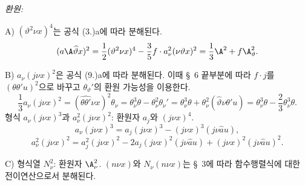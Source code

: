 
\noindent\emph{환원:}

\noindent A) $(\vartheta^2\nu x)^4$는 공식 (3.)a에 따라 분해된다.
\[
(a\A\widehat{\vartheta}x)^2=\frac12(\vartheta^2\nu x)^4-\frac35 f\cdot a_\nu^2(\nu\vartheta x)^2
=\frac13\A^2+f\A_\vartheta^2.
\]

\noindent B) $a_\nu(j\nu x)^2$은 공식 (9.)a에 따라 분해된다. 이때 \S\ 6 끝부분에 따라 $f\cdot j$를 $(\theta\theta'u)^2$으로 바꾸고 $\theta_\vartheta'$의 환원 가능성을 이용한다.
\[
\frac13a_\nu(j\nu x)^2=(\widehat{\theta\theta'}\nu x)^2\theta_\nu
=\theta_\nu^3\theta-\theta_\nu^2\theta_\nu'
=\theta_\nu^3\theta+\theta_\nu^2(\widehat{\vartheta}\nu\theta'u)
=\theta_\nu^3\theta-\frac23\theta_\nu^3\theta.
\]
형식 $a_\nu(j\nu x)^3$과 $a_\nu^2(j\nu x)^2$: 환원자 $a_j$와 $(j\nu x)^4$.
\[
a_\nu(j\nu x)^3=a_j(j\nu x)^3-(j\nu x)^3(j\nu\widehat{a}u),
\]
\[
a_\nu^2(j\nu x)^2=a_j^2(j\nu x)^2-2a_j(j\nu x)^2(j\nu\widehat{a}u)+(j\nu x)^2(j\nu\widehat{a}u)^2.
\]

\noindent C) 형식열 $N_\nu^2$: 환원자 $\A_\nu^2$.
$(n\nu x)$와 $N_\nu(n\nu x)$는 \S\ 3에 따라 함수행렬식에 대한 전이연산으로서 분해된다.
